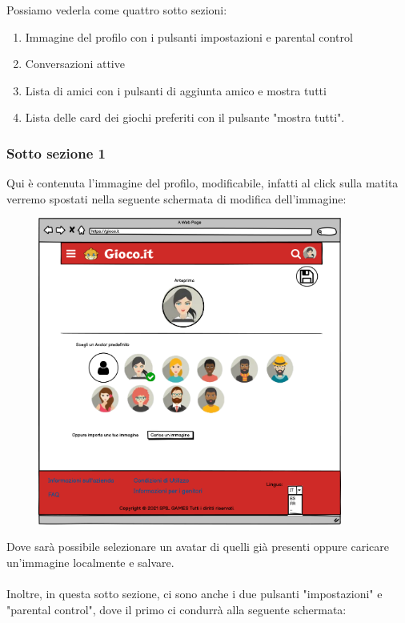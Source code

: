 \documentclass[../Report.tex]{subfiles}
\begin{document}
    Possiamo vederla come quattro sotto sezioni:
    \begin{enumerate}
        \item Immagine del profilo con i pulsanti impostazioni e parental control
        \item Conversazioni attive
        \item Lista di amici con i pulsanti di aggiunta amico e mostra tutti
        \item Lista delle card dei giochi preferiti con il pulsante "mostra tutti".
    \end{enumerate}

    \subsubsection{Sotto sezione 1}
    Qui è contenuta l'immagine del profilo, modificabile, infatti al click sulla matita verremo spostati nella seguente schermata di modifica dell'immagine:
    \begin{figure}[H]
        \includegraphics[width=10cm]{WImageProfile.png}
        \centering
    \end{figure}
    Dove sarà possibile selezionare un avatar di quelli già presenti oppure caricare un'immagine localmente e salvare.\\
    \\
    Inoltre, in questa sotto sezione, ci sono anche i due pulsanti "impostazioni" e "parental control", dove il primo ci condurrà alla seguente schermata:
\end{document}
